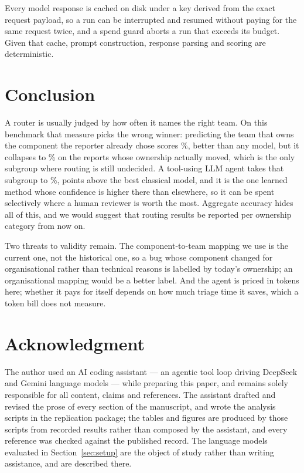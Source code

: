 \documentclass[sigconf,anonymous]{acmart}
\begin{document}
Every model response is cached on disk under a key derived from the exact request payload, so a run
can be interrupted and resumed without paying for the same request twice, and a spend guard aborts
a run that exceeds its budget. Given that cache, prompt construction, response parsing and scoring
are deterministic.

\section{Conclusion}
A router is usually judged by how often it names the right team. On this benchmark that measure
picks the wrong winner: predicting the team that owns the component the reporter already chose
scores \nRepAcc\%, better than any model, but it collapses to \nRepSpecAcc\% on the reports whose
ownership actually moved, which is the only subgroup where routing is still undecided. A tool-using
LLM agent takes that subgroup to \nAgentSpecAcc\%, \nAgentSpecOverLr{} points above the best
classical model, and it is the one learned method whose confidence is higher there than elsewhere,
so it can be spent selectively where a human reviewer is worth the most. Aggregate accuracy hides
all of this, and we would suggest that routing results be reported per ownership category from now
on.

Two threats to validity remain. The component-to-team mapping we use is the current one, not the
historical one, so a bug whose component changed for organisational rather than technical reasons is
labelled by today's ownership; an organisational mapping would be a better label. And the agent is
priced in tokens here; whether it pays for itself depends on how much triage time it saves, which a
token bill does not measure.

\section*{Acknowledgment}
The author used an AI coding assistant --- an agentic tool loop driving DeepSeek and Gemini language
models --- while preparing this paper, and remains solely responsible for all content, claims and
references. The assistant drafted and revised the prose of every section of the manuscript, and wrote
the analysis scripts in the replication package; the tables and figures are produced by those scripts
from recorded results rather than composed by the assistant, and every reference was checked against
the published record. The language models evaluated in Section~\ref{sec:setup} are the object of
study rather than writing assistance, and are described there.


\end{document}
